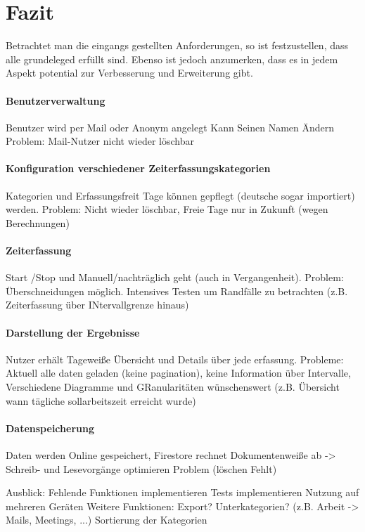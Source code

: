 \section{Fazit}\label{sec:fazit}
Betrachtet man die eingangs gestellten Anforderungen,
so ist festzustellen, dass alle grundeleged erfüllt sind.
Ebenso ist jedoch anzumerken, dass es in jedem Aspekt potential zur Verbesserung und Erweiterung gibt.

\paragraph{Benutzerverwaltung}
Benutzer wird per Mail oder Anonym angelegt
Kann Seinen Namen Ändern
Problem: Mail-Nutzer nicht wieder löschbar

\paragraph{Konfiguration verschiedener Zeiterfassungskategorien}
Kategorien und Erfassungsfreit Tage können gepflegt (deutsche sogar importiert) werden.
Problem: Nicht wieder löschbar, Freie Tage nur in Zukunft (wegen Berechnungen)

\paragraph{Zeiterfassung}
Start /Stop und Manuell/nachträglich geht (auch in Vergangenheit).
Problem: Überschneidungen möglich. Intensives Testen um Randfälle zu betrachten (z.B. Zeiterfassung über INtervallgrenze hinaus)

\paragraph{Darstellung der Ergebnisse}
Nutzer erhält Tageweiße Übersicht und Details über jede erfassung.
Probleme: Aktuell alle daten geladen (keine pagination), keine Information über Intervalle,
Verschiedene Diagramme und GRanularitäten wünschenswert (z.B. Übersicht wann tägliche sollarbeitszeit erreicht wurde)

\paragraph{Datenspeicherung}
Daten werden Online gespeichert,
Firestore rechnet Dokumentenweiße ab -> Schreib- und Lesevorgänge optimieren
Problem (löschen Fehlt)


Ausblick:
Fehlende Funktionen implementieren
Tests implementieren
Nutzung auf mehreren Geräten
Weitere Funktionen:
    Export?
    Unterkategorien? (z.B. Arbeit -> Mails, Meetings, ...)
    Sortierung der Kategorien

